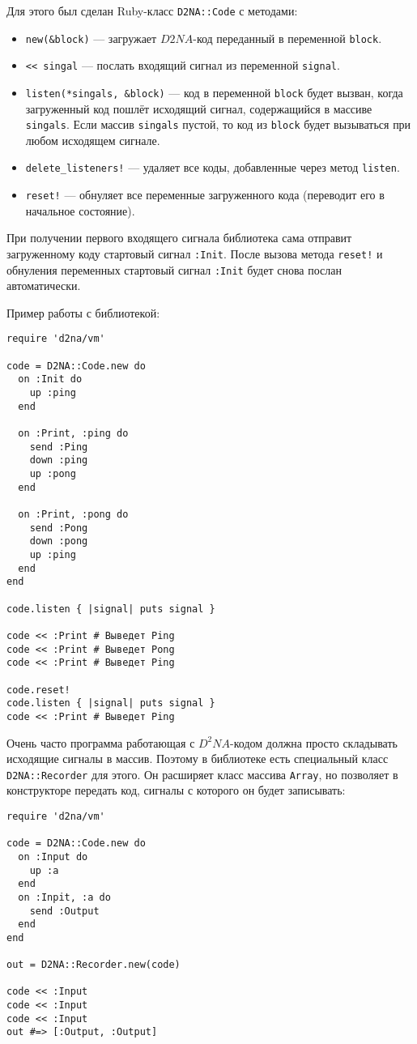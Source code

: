 \documentclass[utf8,a5paper,portrait,10pt]{eskdtext}
\begin{document}
Для этого был сделан Ruby-класс \texttt{D2NA::Code} с методами:
\begin{itemize}
  \item \texttt{new(\&block)} — загружает $D2NA$-код переданный в переменной
        \texttt{block}.
  \item \texttt{{<}< singal} — послать входящий сигнал из переменной
        \texttt{signal}.
  \item \texttt{listen(*singals, \&block)} — код в переменной \texttt{block} будет
        вызван, когда загруженный код пошлёт исходящий сигнал, содержащийся в
        массиве \texttt{singals}. Если массив \texttt{singals} пустой, то код из
        \texttt{block} будет вызываться при любом исходящем сигнале.
  \item \texttt{delete\_listeners!} — удаляет все коды, добавленные через метод
        \texttt{listen}.
  \item \texttt{reset!} — обнуляет все переменные загруженного кода
        (переводит его в начальное состояние).
\end{itemize}

При получении первого входящего сигнала библиотека сама отправит загруженному
коду стартовый сигнал \texttt{:Init}. После вызова метода \texttt{reset!} и
обнуления переменных стартовый сигнал \texttt{:Init} будет снова послан
автоматически.

Пример работы с библиотекой:
\begin{verbatim}
require 'd2na/vm'

code = D2NA::Code.new do
  on :Init do
    up :ping
  end

  on :Print, :ping do
    send :Ping
    down :ping
    up :pong
  end

  on :Print, :pong do
    send :Pong
    down :pong
    up :ping
  end
end

code.listen { |signal| puts signal }

code << :Print # Выведет Ping
code << :Print # Выведет Pong
code << :Print # Выведет Ping

code.reset!
code.listen { |signal| puts signal }
code << :Print # Выведет Ping
\end{verbatim}

Очень часто программа работающая с $D^2NA$-кодом должна просто складывать
исходящие сигналы в массив. Поэтому в библиотеке есть специальный класс
\texttt{D2NA::Recorder} для этого. Он расширяет класс массива \texttt{Array},
но позволяет в конструкторе передать код, сигналы с которого он будет
записывать:
\begin{verbatim}
require 'd2na/vm'

code = D2NA::Code.new do
  on :Input do
    up :a
  end
  on :Inpit, :a do
    send :Output
  end
end

out = D2NA::Recorder.new(code)

code << :Input
code << :Input
code << :Input
out #=> [:Output, :Output]
\end{verbatim}
\end{document}
